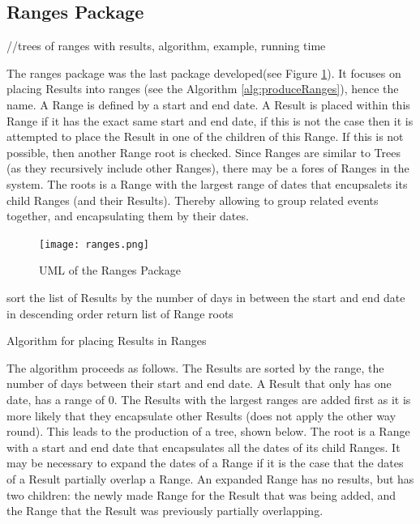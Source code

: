 \subsection{Ranges Package}
//trees of ranges with results, algorithm, example, running time
\par The ranges package was the last package developed(see Figure \ref{fig:ranges}). It focuses on placing Results into ranges (see the Algorithm \ref{alg:produceRanges}), hence the name. A Range is defined by a start and end date. A Result is placed within this Range if it has the exact same start and end date, if this is not the case then it is attempted to place the Result in one of the children of this Range. If this is not possible, then another Range root is checked. Since Ranges are similar to Trees (as they recursively include other Ranges), there may be a fores of Ranges in the system. The roots is a Range with the largest range of dates that encupsalets its child Ranges (and their Results). Thereby allowing to group related events together, and encapsulating them by their dates.  
\begin{figure}[H]
\caption{UML of the Ranges Package}
\label{fig:ranges}
\texttt{[image: ranges.png]}
\centering
\end{figure}
\begin{algorithm}
sort the list of Results by the number of days in between the start and end date in descending order\;
return list of Range roots\;
\caption{Algorithm for placing Results in Ranges}
\label{alg:produceRanges}
\end{algorithm}
\par The algorithm proceeds as follows. The Results are sorted by the range, the number of days between their start and end date. A Result that only has one date, has a range of 0. The Results with the largest ranges are added first as it is more likely that they encapsulate other Results (does not apply the other way round). This leads to the production of a tree, shown below. The root is a Range with a start and end date that encapsulates all the dates of its child Ranges. It may be necessary to expand the dates of a Range if it is the case that the dates of a Result partially overlap a Range. An expanded Range has no results, but has two children: the newly made Range for the Result that was being added, and the Range that the Result was previously partially overlapping.

